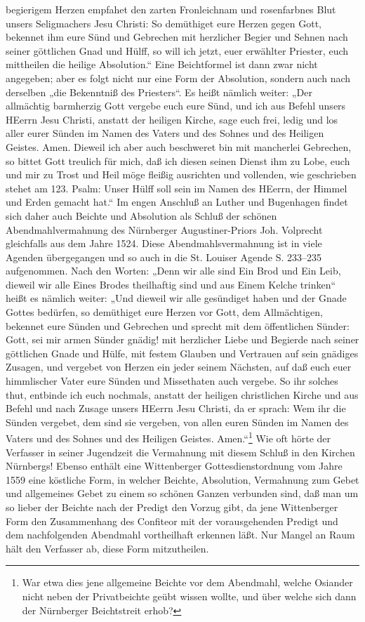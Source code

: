 begierigem Herzen empfahet den zarten Fronleichnam und rosenfarbnes Blut unsers Seligmachers Jesu Christi: So demüthiget eure Herzen gegen Gott, bekennet ihm eure Sünd und Gebrechen mit herzlicher Begier und Sehnen nach seiner göttlichen Gnad und Hülff, so will ich jetzt, euer erwählter Priester, euch mittheilen die heilige Absolution.“ Eine Beichtformel ist dann zwar nicht angegeben; aber es folgt nicht nur eine Form der Absolution, sondern auch nach derselben „die Bekenntniß des Priesters“. Es heißt nämlich weiter: „Der allmächtig barmherzig Gott vergebe euch eure Sünd, und ich aus Befehl unsers HEerrn Jesu Christi, anstatt der heiligen Kirche, sage euch frei, ledig und los aller eurer Sünden im Namen des Vaters und des Sohnes und des Heiligen Geistes. Amen. Dieweil ich aber auch beschweret bin mit mancherlei Gebrechen, so bittet Gott treulich für mich, daß ich diesen seinen Dienst ihm zu Lobe, euch und mir zu Trost und Heil möge fleißig ausrichten und vollenden, wie geschrieben stehet am 123. Psalm: Unser Hülff soll sein im Namen des HEerrn, der Himmel und Erden gemacht hat.“ Im engen Anschluß an Luther und Bugenhagen findet sich daher auch Beichte und Absolution als Schluß der schönen Abendmahlvermahnung des Nürnberger Augustiner-Priors Joh. Volprecht gleichfalls aus dem Jahre 1524. Diese Abendmahlsvermahnung ist in viele Agenden übergegangen und so auch in die St. Louiser Agende S. 233–235 aufgenommen. Nach den Worten: „Denn wir alle sind Ein Brod und Ein Leib, dieweil wir alle Eines Brodes theilhaftig sind und aus Einem Kelche trinken“ heißt es nämlich weiter: „Und dieweil wir alle gesündiget haben und der Gnade Gottes bedürfen, so demüthiget eure Herzen vor Gott, dem Allmächtigen, bekennet eure Sünden und Gebrechen und sprecht mit dem öffentlichen Sünder: Gott, sei mir armen Sünder gnädig! mit herzlicher Liebe und Begierde nach seiner göttlichen Gnade und Hülfe, mit festem Glauben und Vertrauen auf sein gnädiges Zusagen, und vergebet von Herzen ein jeder seinem Nächsten, auf daß euch euer himmlischer Vater eure Sünden und Missethaten auch vergebe. So ihr solches thut, entbinde ich euch nochmals, anstatt der heiligen christlichen Kirche und aus Befehl und nach Zusage unsers HEerrn Jesu Christi, da er sprach: Wem ihr die Sünden vergebet, dem sind sie vergeben, von allen euren Sünden im Namen des Vaters und des Sohnes und des Heiligen Geistes. Amen.“\footnote{War etwa dies jene allgemeine Beichte vor dem Abendmahl, welche Osiander nicht neben der Privatbeichte geübt wissen wollte, und über welche sich dann der Nürnberger Beichtstreit erhob?} Wie oft hörte der Verfasser in seiner Jugendzeit
die Vermahnung mit diesem Schluß in den Kirchen Nürnbergs! Ebenso enthält eine Wittenberger Gottesdienstordnung vom Jahre 1559 eine köstliche Form, in welcher Beichte, Absolution, Vermahnung zum Gebet und allgemeines Gebet zu einem so schönen Ganzen verbunden sind, daß man um so lieber der Beichte nach der Predigt den Vorzug gibt, da jene Wittenberger Form den Zusammenhang des Confiteor mit der vorausgehenden Predigt und dem nachfolgenden Abendmahl vortheilhaft erkennen läßt. Nur Mangel an Raum hält den Verfasser ab, diese Form mitzutheilen.


